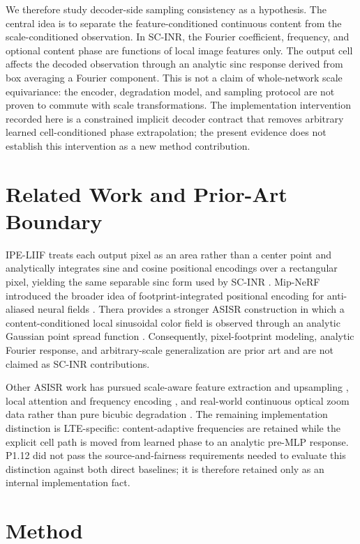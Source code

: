 \documentclass[10pt]{article}
\begin{document}
We therefore study decoder-side sampling consistency as a hypothesis. The central idea is
to separate the feature-conditioned continuous content from the scale-conditioned
observation. In SC-INR, the Fourier coefficient, frequency, and optional content
phase are functions of local image features only. The output cell affects the
decoded observation through an analytic sinc response derived from box averaging
a Fourier component. This is not a claim of whole-network scale equivariance:
the encoder, degradation model, and sampling protocol are not proven to commute
with scale transformations. The implementation intervention recorded here is a
constrained implicit decoder contract that removes arbitrary learned
cell-conditioned phase extrapolation; the present evidence does not establish
this intervention as a new method contribution.

\section{Related Work and Prior-Art Boundary}

IPE-LIIF treats each output pixel as an area rather than a center point and
analytically integrates sine and cosine positional encodings over a rectangular
pixel, yielding the same separable sinc form used by SC-INR
\citep{liu2021ipe}. Mip-NeRF introduced the broader idea of footprint-integrated
positional encoding for anti-aliased neural fields \citep{barron2021mipnerf}.
Thera provides a stronger ASISR construction in which a content-conditioned
local sinusoidal color field is observed through an analytic Gaussian point
spread function \citep{becker2025thera}. Consequently, pixel-footprint modeling,
analytic Fourier response, and arbitrary-scale generalization are prior art and
are not claimed as SC-INR contributions.

Other ASISR work has pursued scale-aware feature extraction and upsampling
\citep{wang2023eqsr}, local attention and frequency encoding
\citep{chen2023clit}, and real-world continuous optical zoom data rather than
pure bicubic degradation \citep{fu2024coz}. The remaining implementation
distinction is LTE-specific: content-adaptive frequencies are retained while
the explicit cell path is moved from learned phase to an analytic pre-MLP
response. P1.12 did not pass the source-and-fairness requirements needed to
evaluate this distinction against both direct baselines; it is therefore
retained only as an internal implementation fact.

\section{Method}
\end{document}
